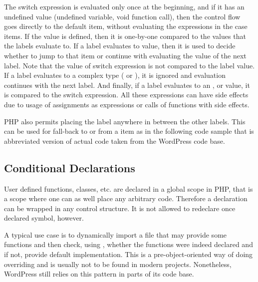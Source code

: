     The switch expression is evaluated only once 
    at the beginning, and if it has an undefined value (undefined variable, 
    void function call), then the control flow goes directly 
    to the default item, without evaluating the expressions 
    in the case items. If the value is defined, then it is 
    one-by-one compared to the values that the 
     labels evaluate to. If a  label evaluates 
    to  value, then it is used to decide whether to 
    jump to that  item or continue with evaluating 
    the value of the next  label. Note that the value of 
    switch expression is not compared to the  label value. 
    If a  label evaluates to a complex type ( or ), 
    it is ignored and evaluation continues with the next  label. 
    And finally, if a  label evaluates to an 
    ,  or  value, it is 
    compared to the switch expression. All these expressions can 
    have side effects due to usage of assignments as expressions 
    or calls of functions with side effects. 
    
    PHP also permits placing the  label anywhere in between 
    the other  labels. This can be used for fall-back 
    to or from a  item as in the following code sample 
    that is abbreviated version of actual code taken from the 
    WordPress \cite{wordpress} code base.
    
    
    
    \subsection{Conditional Declarations}
    User defined functions, classes, etc. are declared in 
    a global scope in PHP, that is a scope where one can 
    as well place any arbitrary code. Therefore a declaration 
    can be wrapped in any control structure. 
    It is not allowed to redeclare once declared symbol, however.
    
    A typical use case is to dynamically import a file 
    that may provide some functions and then check, 
    using , whether the functions were 
    indeed declared and if not, provide default implementation.
    This is a pre-object-oriented way of doing overriding and 
    is usually not to be found in modern projects. Nonetheless, 
    WordPress still relies on this pattern in parts of its code base.
    
